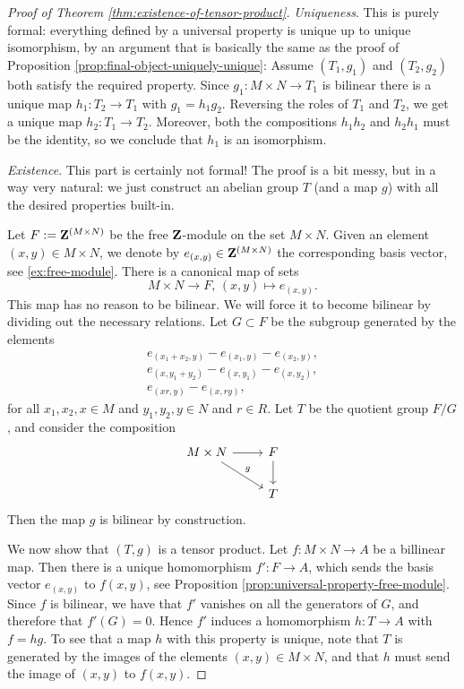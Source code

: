 \documentclass[11pt]{amsbook}
\theoremstyle{plain}
\theoremstyle{definition}
\begin{document}
\begin{proof}[Proof of Theorem \ref{thm:existence-of-tensor-product}]
\emph{Uniqueness}. This is purely formal:  everything defined by a universal property is unique up to unique isomorphism, by an argument  that is basically the same as the proof of Proposition \ref{prop:final-object-uniquely-unique}: 
Assume $(T_1,g_1)$ and $(T_2,g_2)$ both satisfy the required property. Since $g_1\colon M\times N \to T_1$ is bilinear there is a unique map $h_1\colon T_2 \to T_1$ with $g_1=h_1g_2$. Reversing the roles of $T_1$ and $T_2$, we get a unique map $h_2\colon T_1\to T_2$. Moreover, both the compositions $h_1h_2$ and $h_2h_1$ must be the identity, so we conclude that $h_1$ is an isomorphism.

\emph{Existence}. This part is certainly not formal! The proof is a bit messy, but in a way very natural: we just construct an abelian group $T$ (and a map $g$) with all the desired properties built-in. 

Let $F:={\mathbf{Z}}^{(M\times N)}$ be the free ${\mathbf{Z}}$-module on the set $M\times N$. Given an element $(x,y) \in M\times N$, we denote by $e_{(x,y)} \in {\mathbf{Z}}^{(M\times N)}$ the corresponding basis vector, see \ref{ex:free-module}. There is a canonical map of sets
\[
	M\times N \to F,\, (x,y) \mapsto e_{(x,y)}.
\]
This map has no reason to be bilinear. We will force it to become bilinear by dividing out the necessary relations. Let $G\subset F$ be the subgroup generated by the elements
\begin{gather*}
	e_{(x_1+x_2,y)}-e_{(x_1,y)}-e_{(x_2,y)},\\
	e_{(x,y_1+y_2)}-e_{(x,y_1)}-e_{(x,y_2)},\\
	e_{(xr,y)}-e_{(x,ry)},
\end{gather*}
for all $x_1,x_2,x\in M$ and $y_1,y_2,y\in N$ and $r\in R$. Let $T$ be the quotient group $F/G$, and consider the composition
\[
\begin{tikzcd}
M\times N \arrow{r} \arrow{rd}{g} & F \arrow{d} \\
& T
\end{tikzcd}
\]
Then the map $g$ is bilinear by construction.

We now show that $(T,g)$ is a tensor product. Let $f\colon M\times N \to A$ be a billinear map. Then there is a unique homomorphism
$f' \colon F \to A$, which sends the basis vector $e_{(x,y)}$ to $f(x,y)$, see Proposition \ref{prop:universal-property-free-module}.
Since $f$ is bilinear, we have that $f'$ vanishes on all the generators of $G$, and therefore that $f'(G)=0$. Hence $f'$ induces a homomorphism $h\colon T \to A$ with $f=hg$. To see that a map $h$ with this property is unique, note that $T$ is generated by the images of the elements $(x,y)\in M\times N$, and that $h$ must send the image of $(x,y)$ to $f(x,y)$.
\end{proof}
\end{document}
